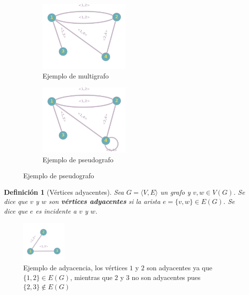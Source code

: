 \documentclass[a4paper,1pt]{report}
\newtheorem*{dfn}{Definición}
\begin{document}
\begin{figure}[h!]
    \centering
    \begin{subfigure}[b]{0.45\textwidth}
    \centering
    \includegraphics[width=0.5\textwidth]{figures/multigrafo.png}
    \caption{Ejemplo de multigrafo}
    \end{subfigure}
    \begin{subfigure}[b]{0.45\textwidth}
        \centering
    \includegraphics[width=0.5\textwidth]{figures/pseudografo.png}
    \caption{Ejemplo de pseudografo}
    \end{subfigure}
\end{figure} 

\begin{dfn}[Vértices adyacentes]
   Sea $G = \langle V, E \rangle $ un grafo y $v, w \in V(G)$. Se dice que $v$ y $w$ son \textbf{v\'ertices adyacentes} si la arista $e = \{v, w\}\in E(G)$. Se dice que $e$ es incidente a $v$ y $w$.
\end{dfn}

\begin{figure}[H]
    \centering
    \includegraphics[width=0.2\textwidth]{figures/adyacentes.png}
\caption{Ejemplo de adyacencia, los v\'ertices $1$ y $2$ son adyacentes ya que $\{1,2\} \in E(G)$, mientras que $2$ y $3$ no son adyacentes pues $\{2,3\} \notin E(G)$}
\end{figure}
\end{document}
